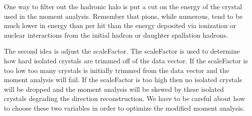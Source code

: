 \documentclass[11pt]{article}
\begin{document}
One way to filter out the hadronic halo is put a cut on the energy of the crystal used in the moment analysis.  Remember that pions, while numerous, tend to be much lower in energy than per hit than the energy deposited via ionization or nuclear interactions from the initial hadron or daughter spallation hadrons.  

The second idea is adjust the scaleFactor.  The scaleFactor is used to determine how hard isolated crystals are trimmed off of the data vector.    If the scaleFactor is too low too many crystals is initially trimmed from the data vector and the moment analysis will fail.  If the scaleFactor is too high then no isolated crystals will be dropped and the moment analysis will be skewed by these isolated crystals degrading the direction reconstruction.  We have to be careful about how to choose these two variables in order to optimize the modified moment analysis.  
\end{document}
